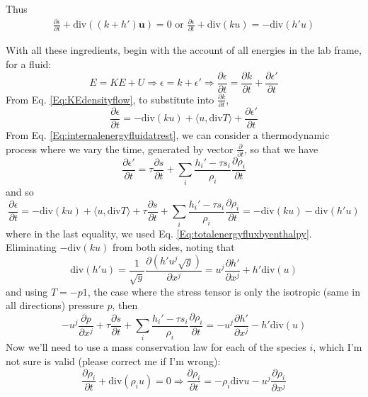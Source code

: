 \documentclass[10pt]{amsart}
\begin{document}
\begin{multicols*}{2}
\begin{enumerate}
Thus
\begin{equation}\label{Eq:totalenergyfluxbyenthalpy}
\begin{gathered}
  \frac{ \partial \epsilon }{ \partial t} + \text{div}( (k+h')\mathbf{u} ) = 0 \text{ or } \frac{ \partial \epsilon }{ \partial t} + \text{div}(ku) = -\text{div}(h'u)
\end{gathered}
\end{equation}

With all these ingredients, begin with the account of all energies in the lab frame, for a fluid:
\[
E= KE + U \Longrightarrow \epsilon = k + \epsilon' \Longrightarrow \frac{ \partial \epsilon }{ \partial t} = \frac{ \partial k }{ \partial t} + \frac{ \partial \epsilon'}{ \partial t}
\]
From Eq. \ref{Eq:KEdensityflow}, to substitute into $\frac{ \partial k}{ \partial t}$, 
\[
\frac{ \partial \epsilon}{ \partial t} = -\text{div}(ku) + \langle u, \text{div}T \rangle + \frac{ \partial \epsilon'}{ \partial t}
\]
From Eq. \ref{Eq:internalenergyfluidatrest}, we can consider a thermodynamic process where we vary the time, generated by vector $\frac{ \partial }{ \partial t}$, so that we have
\[
\frac{ \partial \epsilon'}{ \partial t} = \tau \frac{ \partial s}{ \partial t} + \sum_i \frac{h_i'-\tau s_i}{\rho_i} \frac{ \partial \rho_i}{ \partial t}
\]
and so 
\[
\frac{ \partial \epsilon}{ \partial t} = -\text{div}(ku) + \langle u, \text{div}T \rangle + \tau \frac{ \partial s}{ \partial t} + \sum_i \frac{h_i'-\tau s_i}{\rho_i} \frac{ \partial \rho_i}{ \partial t} = -\text{div}(ku) - \text{div}(h'u)
\]
where in the last equality, we used Eq. \ref{Eq:totalenergyfluxbyenthalpy}.  Eliminating $-\text{div}(ku)$ from both sides, noting that 
\[
\text{div}(h'u) = \frac{1}{\sqrt{g}} \frac{ \partial (h'u^j \sqrt{g} )}{ \partial x^j} = u^j \frac{ \partial h'}{ \partial x^j} + h'\text{div}(u)
\]
and using $T = -p1$, the case where the stress tensor is only the isotropic (same in all directions) pressure $p$, then
\begin{equation}\label{Eq:provingisentropicflow}
-u^j \frac{ \partial p}{ \partial x^j} + \tau \frac{ \partial s}{ \partial t} + \sum_i \frac{ h_i' - \tau s_i}{ \rho_i} \frac{ \partial \rho_i}{ \partial t} =  - u^j \frac{ \partial h'}{ \partial x^j} - h'\text{div}(u)
\end{equation}
Now we'll need to use a mass conservation law for each of the species $i$, which I'm not sure is valid (please correct me if I'm wrong):
\[
\frac{ \partial \rho_i}{ \partial t} + \text{div}(\rho_i u) =0 \Longrightarrow \frac{ \partial \rho_i}{ \partial t} = - \rho_i \text{div}u - u^j \frac{ \partial \rho_i}{ \partial x^j}
\]
\end{enumerate}
\end{multicols*}
\end{document}

